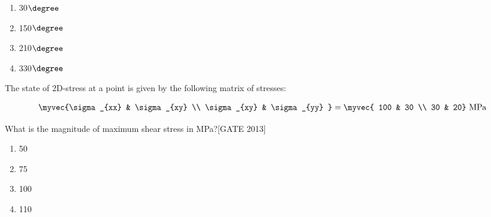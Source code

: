     \begin{multicols}{2}
    \begin{enumerate}
        \item 30$\degree$
        \item 150$\degree$
        \item 210$\degree$
        \item 330$\degree$
    \end{enumerate}
    \end{multicols}

  

\item The state of 2D-stress at a point is given by the following matrix of stresses:

\begin{align*}
    \myvec{\sigma_{xx} & \sigma_{xy} \\
\sigma_{xy} & \sigma_{yy}
}
=
\myvec{
100 & 30 \\
30 & 20} \text{ MPa}
\end{align*}



What is the magnitude of maximum shear stress in MPa?\hfill{[GATE 2013]}
\begin{multicols}{4}
\begin{enumerate}
    \item 50
    \item 75
    \item 100
    \item110
\end{enumerate}
\end{multicols}



